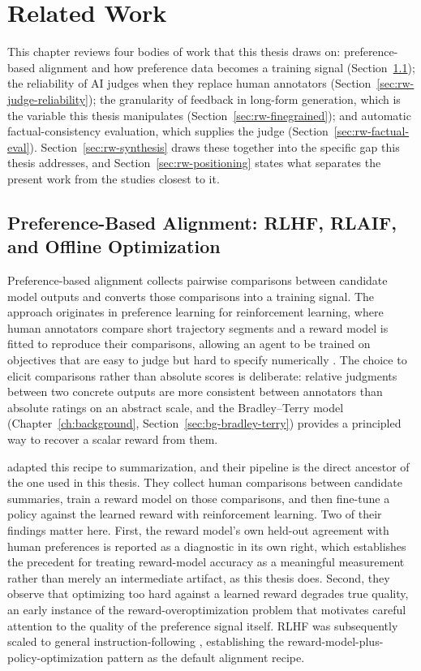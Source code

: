 \chapter{Related Work}
\label{ch:related-work}

This chapter reviews four bodies of work that this thesis draws on: preference-based
alignment and how preference data becomes a training signal
(Section~\ref{sec:rw-rlhf-rlaif}); the reliability of AI judges when they replace
human annotators (Section~\ref{sec:rw-judge-reliability}); the granularity of
feedback in long-form generation, which is the variable this thesis manipulates
(Section~\ref{sec:rw-finegrained}); and automatic factual-consistency evaluation,
which supplies the judge (Section~\ref{sec:rw-factual-eval}).
Section~\ref{sec:rw-synthesis} draws these together into the specific gap this
thesis addresses, and Section~\ref{sec:rw-positioning} states what separates the
present work from the studies closest to it.

\section{Preference-Based Alignment: RLHF, RLAIF, and Offline Optimization}
\label{sec:rw-rlhf-rlaif}

Preference-based alignment collects pairwise comparisons between candidate model
outputs and converts those comparisons into a training signal. The approach
originates in preference learning for reinforcement learning, where human
annotators compare short trajectory segments and a reward model is fitted to
reproduce their comparisons, allowing an agent to be trained on objectives that
are easy to judge but hard to specify numerically \citep{christiano2017deep}. The
choice to elicit comparisons rather than absolute scores is deliberate: relative
judgments between two concrete outputs are more consistent between annotators than
absolute ratings on an abstract scale, and the Bradley--Terry model
(Chapter~\ref{ch:background}, Section~\ref{sec:bg-bradley-terry}) provides a
principled way to recover a scalar reward from them.

\citet{stiennon2020learning} adapted this recipe to summarization, and their
pipeline is the direct ancestor of the one used in this thesis. They collect human
comparisons between candidate summaries, train a reward model on those comparisons,
and then fine-tune a policy against the learned reward with reinforcement learning.
Two of their findings matter here. First, the reward model's own held-out agreement
with human preferences is reported as a diagnostic in its own right, which
establishes the precedent for treating reward-model accuracy as a meaningful
measurement rather than merely an intermediate artifact, as this thesis does.
Second, they observe that optimizing too hard against a learned reward degrades
true quality, an early instance of the reward-overoptimization problem that
motivates careful attention to the quality of the preference signal itself. RLHF
was subsequently scaled to general instruction-following \citep{ouyang2022training},
establishing the reward-model-plus-policy-optimization pattern as the default
alignment recipe.

